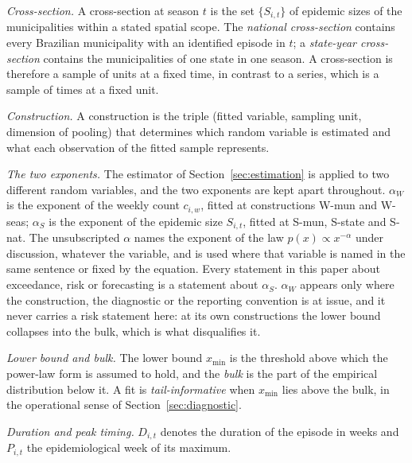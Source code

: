 \documentclass[english,10pt,b5paper]{article}
\newcommand{\lvl}[1]{\mbox{#1}}
\begin{document}
\emph{Cross-section.} A cross-section at season $t$ is the set $\{S_{i,t}\}$ of
epidemic sizes of the municipalities within a stated spatial scope. The
\emph{national cross-section} contains every Brazilian municipality with an
identified episode in $t$; a \emph{state-year cross-section} contains the
municipalities of one state in one season. A cross-section is therefore a sample
of units at a fixed time, in contrast to a series, which is a sample of times at
a fixed unit.

\emph{Construction.} A construction is the triple (fitted variable, sampling
unit, dimension of pooling) that determines which random variable is estimated
and what each observation of the fitted sample represents.

\emph{The two exponents.} The estimator of Section~\ref{sec:estimation} is
applied to two different random variables, and the two exponents are kept apart
throughout. $\alpha_W$ is the exponent of the weekly count $c_{i,w}$, fitted at
constructions \lvl{W-mun} and \lvl{W-seas}; $\alpha_S$ is the exponent of the
epidemic size $S_{i,t}$, fitted at \lvl{S-mun}, \lvl{S-state} and \lvl{S-nat}.
The unsubscripted $\alpha$ names the exponent of the law
$p(x)\propto x^{-\alpha}$ under discussion, whatever the variable, and is used
where that variable is named in the same sentence or fixed by the equation.
Every statement in this paper about exceedance, risk or forecasting is a statement
about $\alpha_S$. $\alpha_W$ appears only where the construction, the diagnostic or
the reporting convention is at issue, and it never carries a risk statement here: at
its own constructions the lower bound collapses into the bulk, which is what
disqualifies it.

\emph{Lower bound and bulk.} The lower bound $x_{\min}$ is the threshold above
which the power-law form is assumed to hold, and the \emph{bulk} is the part of
the empirical distribution below it. A fit is \emph{tail-informative} when
$x_{\min}$ lies above the bulk, in the operational sense of
Section~\ref{sec:diagnostic}.

\emph{Duration and peak timing.} $D_{i,t}$ denotes the duration of the episode
in weeks and $P_{i,t}$ the epidemiological week of its maximum.
\end{document}
